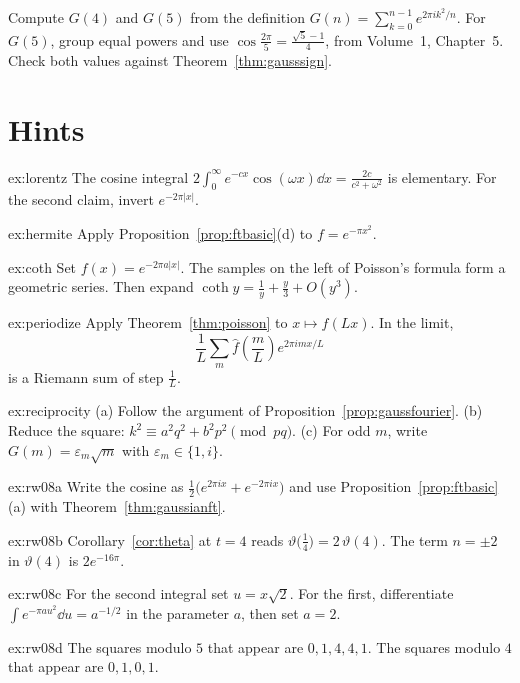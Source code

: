 \begin{exercise}[$\star\star\star$]\label{ex:rw08d}
Compute $G(4)$ and $G(5)$ from the definition $G(n)=\sum_{k=0}^{n-1}e^{2\pi ik^2/n}$. For $G(5)$, group equal powers and use $\cos\frac{2\pi}5=\frac{\sqrt5-1}4$, from Volume~1, Chapter~5. Check both values against Theorem~\ref{thm:gausssign}.
\end{exercise}

\section{Hints}

\begin{hint}{ex:lorentz}
The cosine integral $2\int_0^\infty e^{-cx}\cos(\omega x)\dd x=\frac{2c}{c^2+\omega^2}$ is elementary. For the second claim, invert $e^{-2\pi|x|}$.
\end{hint}
\begin{hint}{ex:hermite}
Apply Proposition~\ref{prop:ftbasic}(d) to $f=e^{-\pi x^2}$.
\end{hint}
\begin{hint}{ex:coth}
Set $f(x)=e^{-2\pi a|x|}$. The samples on the left of Poisson's formula form a geometric series. Then expand $\coth y=\frac1y+\frac y3+O(y^3)$.
\end{hint}
\begin{hint}{ex:periodize}
Apply Theorem~\ref{thm:poisson} to $x\mapsto f(Lx)$. In the limit,
\[
\frac1L\sum_m\hat f(\frac mL)e^{2\pi imx/L}
\]
is a Riemann sum of step $\frac1L$.
\end{hint}
\begin{hint}{ex:reciprocity}
(a) Follow the argument of Proposition~\ref{prop:gaussfourier}. (b) Reduce the square: $k^2\equiv a^2q^2+b^2p^2\pmod{pq}$. (c) For odd $m$, write $G(m)=\varepsilon_m\sqrt m$ with $\varepsilon_m\in\{1,i\}$.
\end{hint}

\begin{hint}{ex:rw08a}
Write the cosine as $\frac12\bigl(e^{2\pi ix}+e^{-2\pi ix}\bigr)$ and use Proposition~\ref{prop:ftbasic}(a) with Theorem~\ref{thm:gaussianft}.
\end{hint}
\begin{hint}{ex:rw08b}
Corollary~\ref{cor:theta} at $t=4$ reads $\vartheta\bigl(\frac14\bigr)=2\,\vartheta(4)$. The term $n=\pm2$ in $\vartheta(4)$ is $2e^{-16\pi}$.
\end{hint}
\begin{hint}{ex:rw08c}
For the second integral set $u=x\sqrt2$. For the first, differentiate $\int e^{-\pi a u^2}\dd u=a^{-1/2}$ in the parameter $a$, then set $a=2$.
\end{hint}
\begin{hint}{ex:rw08d}
The squares modulo $5$ that appear are $0,1,4,4,1$. The squares modulo $4$ that appear are $0,1,0,1$.
\end{hint}

